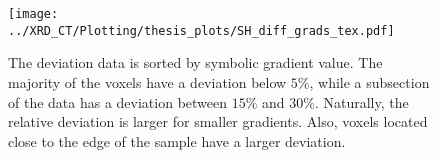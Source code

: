 \begin{figure}[h!]
    \centering
    \texttt{[image: ../XRD\_CT/Plotting/thesis\_plots/SH\_diff\_grads\_tex.pdf]}
    \caption{The deviation data is sorted by symbolic gradient value.
        The majority of the voxels have a deviation below $5\%$, while a subsection of the data has a deviation between $15\%$ and $30\%$.
        Naturally, the relative deviation is larger for smaller gradients.
        Also, voxels located close to the edge of the sample have a larger deviation.}
    \label{fig:gradient_comparison}
\end{figure} %



